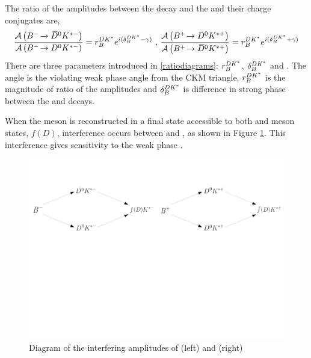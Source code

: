 The ratio of the amplitudes between the \decay{\Bm}{\Dzb\Kstarm} decay and the \decay{\Bm}{\Dz\Kstarm} and their charge conjugates are,
\begin{equation}
\frac{\mathcal{A}\left({{{B}^-}}\!\rightarrow {\ensuremath{{\kern 0.2em\overline{\kern -0.2em D}{}}{}^0}}{\ensuremath{{K}^{*-}}}\right)}{\mathcal{A}\left({{{B}^-}}\!\rightarrow {\ensuremath{{D}^0}}{\ensuremath{{K}^{*-}}}\right)} = r_B^{DK^*} e^{i(\delta_B^{DK^*} - \gamma)} \text{ , }
\frac{\mathcal{A}\left({{{B}^+}}\!\rightarrow {\ensuremath{{D}^0}}{\ensuremath{{K}^{*+}}}\right)}{\mathcal{A}\left({{{B}^+}}\!\rightarrow {\ensuremath{{\kern 0.2em\overline{\kern -0.2em D}{}}{}^0}}{\ensuremath{{K}^{*+}}}\right)} = r_B^{DK^*} e^{i(\delta_B^{DK^*} + \gamma)}
\label{ratiodiagrams}
\end{equation}
There are three parameters introduced in \eqn\ref{ratiodiagrams}: $r_B^{DK^*}$, $\delta_B^{DK^*}$ and \Pgamma. The angle \Pgamma is the \CP violating weak phase angle from the CKM triangle, $r_B^{DK^*}$ is the magnitude of ratio of the amplitudes and $\delta_B^{DK^*}$ is difference in strong phase between the \decay{\Bm}{\Dz\Kstarm} and \decay{\Bm}{\Dzb\Kstarm} decays.

When the \D meson is reconstructed in a final state accessible to both \Dz and \Dzb meson states, $f(D)$, interference occurs between \decay{\Bm}{\Dz\Kstarm} and \decay{\Bm}{\Dzb\Kstarm}, as shown in Figure \ref{paths}. This interference gives sensitivity to the weak phase \Pgamma.

\begin{figure}
\centering
\includegraphics[trim = 0mm 120mm 0mm 30mm,clip,width=\linewidth]{figures/theory/pathDiagrams.pdf}
\caption{Diagram of the interfering amplitudes of \decay{\Bm}{\D\Kstarm} (left) and \decay{\Bp}{\D\Kstarp} (right)}
\label{paths}
\end{figure}

